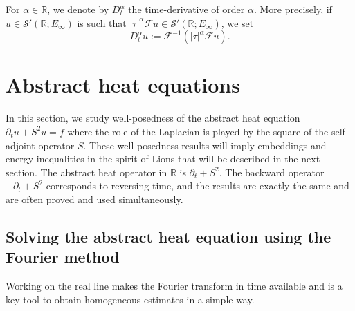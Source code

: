 \documentclass[11pt, letterpaper]{amsart}
\theoremstyle{definition}
\theoremstyle{remark}
\numberwithin{equation}{section}
\begin{document}
For $\alpha \in \mathbb{R}$, we denote by $D_t^\alpha$ the time-derivative of order $\alpha$. More precisely, if $u \in \mathcal{S'}(\mathbb{R};E_\infty)$ is such that $\left | \tau \right |^{\alpha} \mathcal{F}u  \in \mathcal{S'}(\mathbb{R};E_\infty)$, we set 
\begin{equation*}
    D_t^\alpha u := \mathcal{F}^{-1} \left ( \left | \tau \right |^{\alpha} \mathcal{F}u \right ) .
\end{equation*}



\section{Abstract heat equations }\label{Section 3}
 In this section, we study well-posedness of the abstract heat equation $\partial_t u + S^2u =f$ where the role of the Laplacian is played by the square of the self-adjoint operator $S$.  These well-posedness results will imply  embeddings and energy inequalities in the spirit of Lions that will be described in the next section. 
The abstract heat operator in $\mathbb{R}$ is $\partial_t +S^2$. The  
backward operator $-\partial_t +S^2$  corresponds to reversing time, and the results are exactly the same and are often proved and used simultaneously.

\subsection{Solving the abstract heat equation using the Fourier method}

Working on the real line makes the Fourier transform in time available and is a key tool to obtain homogeneous estimates in a simple way.
\end{document}
